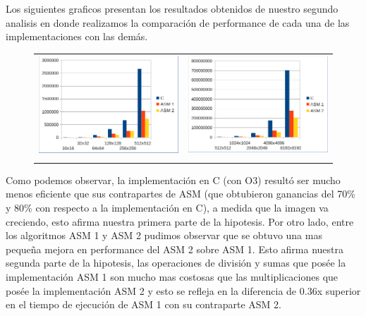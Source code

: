 Los siguientes graficos presentan los resultados obtenidos de nuestro segundo analisis en donde realizamos la comparación de performance de cada una de las implementaciones con las demás.

\begin{figure}[h!]
	\centering
	\begin{tabular}{ll}
		\includegraphics[width=250px]{imgs/sepia-analisis2-1.png} & \includegraphics[width=250px]{imgs/sepia-analisis2-2.png} \\
		\vspace{1em}
	\end{tabular}
\end{figure}

Como podemos observar, la implementación en C (con O3) resultó ser mucho menos eficiente que sus contrapartes de ASM (que obtubieron ganancias del 70\% y 80\% con respecto a la implementación en C), a medida que la imagen va creciendo, esto afirma nuestra primera parte de la hipotesis. Por otro lado, entre los algoritmos ASM 1 y ASM 2 pudimos observar que se obtuvo una mas pequeña mejora en performance del ASM 2 sobre ASM 1. Esto afirma nuestra segunda parte de la hipotesis, las operaciones de división y sumas que posée la implementación ASM 1 son mucho mas costosas que las multiplicaciones que posée la implementación ASM 2 y esto se refleja en la diferencia de 0.36x superior en el tiempo de ejecución de ASM 1 con su contraparte ASM 2.

